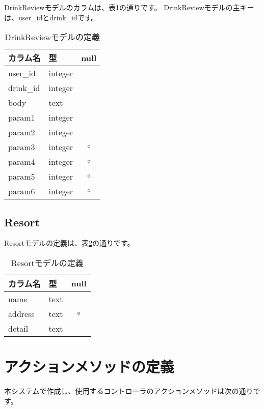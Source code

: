 \documentclass[a4j,titlepage]{jarticle}
\begin{document}
DrinkReviewモデルのカラムは、表\ref{drink_review}の通りです。
DrinkReviewモデルの主キーは、user\_idとdrink\_idです。

\begin{table}[!htbp]
\caption{DrinkReviewモデルの定義}
\label{drink_review}
\small
\begin{center}
\begin{tabular}{|l|l|c|}\hline
カラム名 & 型 & null \\\hline\hline
user\_id & integer & \\\hline
drink\_id & integer & \\\hline
body & text & \\\hline
param1 & integer & \\\hline
param2 & integer & \\\hline
param3 & integer & $\circ$ \\\hline
param4 & integer & $\circ$ \\\hline
param5 & integer & $\circ$ \\\hline
param6 & integer & $\circ$ \\\hline
\end{tabular}
\end{center}
\end{table}

\subsection{Resort}
Resortモデルの定義は、表\ref{resort}の通りです。

\begin{table}[!htbp]
\caption{Resortモデルの定義}
\label{resort}
\small
\begin{center}
\begin{tabular}{|l|l|c|}\hline
カラム名 & 型 & null \\\hline\hline
name & text & \\\hline
address & text & $\circ$ \\\hline
detail & text & \\\hline
\end{tabular}
\end{center}
\end{table}


\clearpage
\section{アクションメソッドの定義}
本システムで作成し、使用するコントローラのアクションメソッドは次の通りです。
\end{document}

